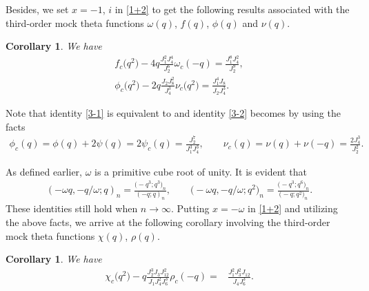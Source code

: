 \documentclass[pdftex]{sigma}
\numberwithin{equation}{section}
\newtheorem{Corollary}[Theorem]{Corollary}
\begin{document}
Besides, we set $x=-1$, $i$ in \eqref{1+2} to get the following results associated with the third-order mock theta functions $\omega(q)$, $f(q)$, $\phi(q)$ and $\nu(q)$.

 \begin{Corollary}%
We have
\begin{gather}
f_c\bigl(q^2\bigr)-4q\frac{J_1^2J_4^4}{J_2^6}\omega_c(-q)
=\frac{J_1^8J_4^2}{J_2^9},\label{3-1}\\
\phi_c\bigl(q^2\bigr)-2q\frac{J_2J_8^2}{J_4^3}\nu_c\bigl(q^2\bigr)
=\frac{J_1^4J_8}{J_2J_4^3}.\label{3-2}
\end{gather}
\end{Corollary}
Note that identity \eqref{3-1} is equivalent to \cite[equation (9)]{ZS} and identity \eqref{3-2} becomes \cite[Corollary 2.2]{HZ} by using the facts \cite{BKLMR,Mc}
\begin{gather*}
\phi_c(q)=\phi(q)+2\psi(q)=2\psi_c(q)=\frac{J_2^7}{J_1^3J_4^3},\qquad
\nu_c(q)=\nu(q)+\nu(-q)=\frac{2J_4^3}{J_2^2}.
\end{gather*}



As defined earlier, $\omega$ is a primitive cube root of unity. It is evident that
\begin{gather*}
(-\omega q,-q/\omega;q)_n=\frac{\bigl(-q^3;q^3\bigr)_n}{(-q;q)_n},\qquad
\bigl(-\omega q,-q/\omega;q^2\bigr)_n=\frac{\bigl(-q^3;q^6\bigr)_n}{\bigl(-q;q^2\bigr)_n}.
\end{gather*}
These identities still hold when $n\rightarrow \infty$. Putting $x=-\omega$ in \eqref{1+2} and utilizing the above facts, we arrive at the following corollary involving the third-order mock theta functions $\chi(q)$, $\rho(q)$.
\begin{Corollary}
We have
\begin{align}
\label{0+3}
\chi_c\bigl(q^2\bigr)-q\frac{J_2^3J_3J_{12}^2}{J_1J_4^2J_6^3}\rho_c(-q)
=&\frac{J_1^2J_3^2J_{12}}{J_4J_6^3}.
\end{align}
\end{Corollary}
\end{document}
